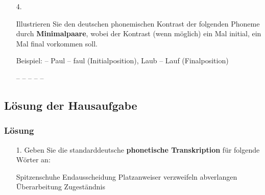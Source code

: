 {\begin{frame}
\begin{itemize}	
	\item[4.]{Illustrieren Sie den deutschen phonemischen Kontrast der folgenden Phoneme durch \textbf{Minimalpaare}, wobei der Kontrast (wenn möglich) ein Mal initial, ein Mal final vorkommen soll.
	
	Beispiel: \textipa{[p]} -- \textipa{[f]} Paul -- faul (Initialposition), Laub -- Lauf (Finalposition)}

	\ea \label{ex:HA4}
		\ea \textipa{[m]} -- \textipa{[n]}
		\ex \textipa{[p]} -- \textipa{[b]}
		\ex \textipa{[h]} -- \textipa{[v]}
		\ex \textipa{[n]} -- \textipa{[N]}
		\ex \textipa{[f]} -- \textipa{[v]}
		\z
	\z
	
\end{itemize}
\end{frame}

\subsection*{Lösung der Hausaufgabe}

\begin{frame}
\frametitle{Lösung}

\begin{itemize}
	\item[1.]{Geben Sie die standarddeutsche \textbf{phonetische Transkription} für folgende Wörter an:}
	
	\begin{exe}
		\begin{xlist}
		\settowidth{}
			\ex Spitzenschuhe 
			\ex Endausscheidung 
			\ex Platzanweiser 
			\ex verzweifeln 
			\ex abverlangen 
			\ex Überarbeitung 
			\ex Zugeständnis 
		\end{xlist}
	\end{exe}

\end{itemize}

\end{frame}

}
